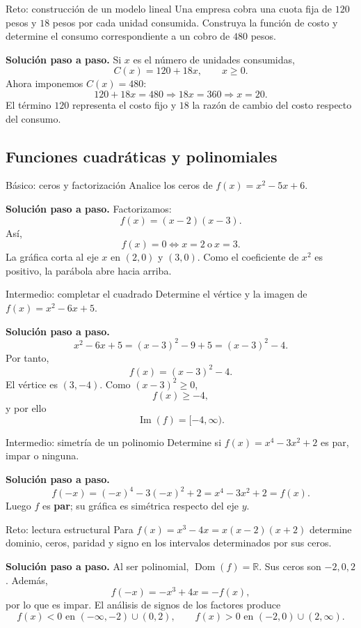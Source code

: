 \documentclass[aspectratio=169,10pt]{beamer}
\newcommand{\R}{\mathbb{R}}
\newcommand{\Dom}{\operatorname{Dom}}
\newcommand{\Ima}{\operatorname{Im}}
\begin{document}
\begin{frame}{Reto: construcción de un modelo lineal}
Una empresa cobra una cuota fija de $120$ pesos y $18$ pesos por cada unidad consumida. Construya la función de costo y determine el consumo correspondiente a un cobro de $480$ pesos.

\textbf{Solución paso a paso.} Si $x$ es el número de unidades consumidas,
\[
C(x)=120+18x,\qquad x\ge0.
\]
Ahora imponemos $C(x)=480$:
\[
120+18x=480\Longrightarrow 18x=360\Longrightarrow \boxed{x=20}.
\]
El término $120$ representa el costo fijo y $18$ la razón de cambio del costo respecto del consumo.
\end{frame}

\subsection{Funciones cuadráticas y polinomiales}

\begin{frame}{Básico: ceros y factorización}
Analice los ceros de $f(x)=x^2-5x+6$.

\textbf{Solución paso a paso.} Factorizamos:
\[
f(x)=(x-2)(x-3).
\]
Así,
\[
f(x)=0\Longleftrightarrow x=2\ \text{o}\ x=3.
\]
La gráfica corta al eje $x$ en $(2,0)$ y $(3,0)$. Como el coeficiente de $x^2$ es positivo, la parábola abre hacia arriba.
\end{frame}

\begin{frame}{Intermedio: completar el cuadrado}
Determine el vértice y la imagen de $f(x)=x^2-6x+5$.

\textbf{Solución paso a paso.}
\[
x^2-6x+5=(x-3)^2-9+5=(x-3)^2-4.
\]
Por tanto,
\[
\boxed{f(x)=(x-3)^2-4}.
\]
El vértice es $(3,-4)$. Como $(x-3)^2\ge0$,
\[
f(x)\ge-4,
\]
y por ello
\[
\boxed{\Ima(f)=[-4,\infty)}.
\]
\end{frame}

\begin{frame}{Intermedio: simetría de un polinomio}
Determine si $f(x)=x^4-3x^2+2$ es par, impar o ninguna.

\textbf{Solución paso a paso.}
\[
f(-x)=(-x)^4-3(-x)^2+2=x^4-3x^2+2=f(x).
\]
Luego $f$ es \textbf{par}; su gráfica es simétrica respecto del eje $y$.
\end{frame}

\begin{frame}{Reto: lectura estructural}
Para $f(x)=x^3-4x=x(x-2)(x+2)$ determine dominio, ceros, paridad y signo en los intervalos determinados por sus ceros.

\textbf{Solución paso a paso.} Al ser polinomial, $\Dom(f)=\R$. Sus ceros son $-2,0,2$. Además,
\[
f(-x)=-x^3+4x=-f(x),
\]
por lo que es impar. El análisis de signos de los factores produce
\[
f(x)<0\text{ en }(-\infty,-2)\cup(0,2),
\qquad
f(x)>0\text{ en }(-2,0)\cup(2,\infty).
\]
\end{frame}
\end{document}
